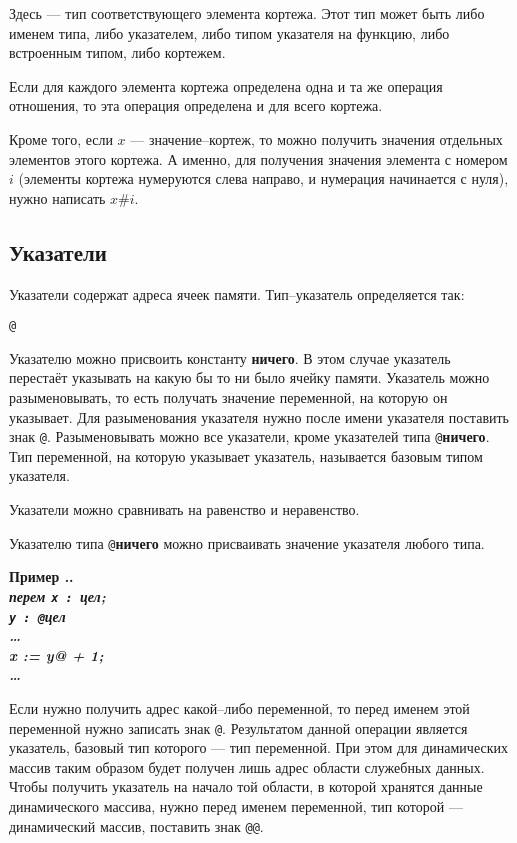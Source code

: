 \documentclass[10pt]{report}
\newcounter{exam}[section]
\renewcommand{\theexam}{\thesection.\arabic{exam}}
\newenvironment{Example}{\par\refstepcounter{exam}\bf Пример \theexam. \sl}{\rm\par}
\begin{document}
Здесь   --- тип соответствующего элемента кортежа. Этот тип может быть либо именем типа, либо указателем, либо типом указателя на функцию, либо встроенным типом, либо кортежем.

Если для каждого элемента кортежа определена одна и та же операция отношения, то эта операция определена и для всего кортежа.

Кроме того, если $x$ --- значение--кортеж, то можно получить значения отдельных элементов этого кортежа. А именно, для получения значения элемента с номером $i$ (элементы кортежа нумеруются слева направо, и нумерация начинается с нуля), нужно написать $x\texttt{\#}i$.


\subsection{Указатели}
Указатели содержат адреса ячеек памяти. Тип--указатель определяется так:
\begin{center}
	\texttt{@}
\end{center}

Указателю можно присвоить константу \textbf{ничего}. В этом случае указатель перестаёт указывать на какую бы то ни было ячейку памяти. Указатель можно разыменовывать, то есть
получать значение переменной, на которую он указывает. Для разыменования указателя нужно после имени указателя поставить знак \texttt{@}. Разыменовывать можно все указатели,
кроме указателей типа \texttt{@}\textbf{ничего}. Тип переменной, на которую указывает указатель, называется базовым типом указателя.

Указатели можно сравнивать на равенство и неравенство. 

Указателю типа \texttt{@}\textbf{ничего} можно присваивать значение указателя любого типа.

\begin{Example}\\
	\rm
	\textbf{перем} \texttt{x : }\textbf{цел};\\
	\hspace*{12mm}\texttt{y : @}\textbf{цел}\\
	\hspace*{12mm}\dots\\
	\hspace*{12mm}x := y@ + 1;\\
	\hspace*{12mm}\dots
\end{Example}

Если нужно получить адрес какой--либо переменной, то перед именем этой переменной нужно записать знак \texttt{@}. Результатом данной операции является указатель, базовый тип которого --- тип переменной. При этом для динамических массив таким образом будет получен лишь адрес области служебных данных. Чтобы получить указатель на начало той области, в которой хранятся данные динамического массива, нужно перед именем переменной, тип которой --- динамический массив, поставить знак \texttt{@@}.
\end{document}
